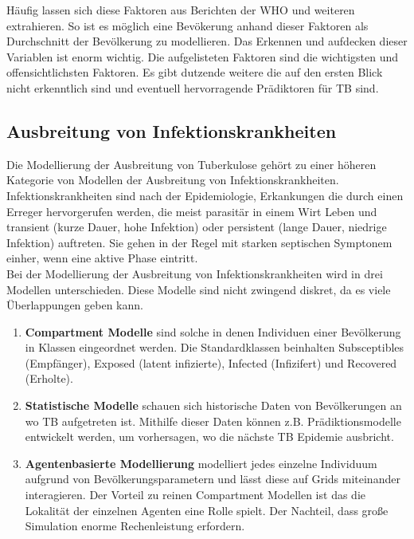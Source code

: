 \documentclass[paper=a4, fontsize=11pt, ngerman, abstract=on]{scrartcl}
\numberwithin{equation}{section} %
\numberwithin{figure}{section} %
\numberwithin{table}{section} %
\begin{document}
Häufig lassen sich diese Faktoren aus Berichten der WHO und weiteren extrahieren. So ist es möglich eine Bevökerung anhand dieser Faktoren als Durchschnitt der Bevölkerung zu modellieren. Das Erkennen und aufdecken dieser Variablen ist enorm wichtig. Die aufgelisteten Faktoren sind die wichtigsten und offensichtlichsten Faktoren. Es gibt dutzende weitere die auf den ersten Blick nicht erkenntlich sind und eventuell hervorragende Prädiktoren für TB sind. \cite{WHOTB2016}

\subsection{Ausbreitung von Infektionskrankheiten}

Die Modellierung der Ausbreitung von Tuberkulose gehört zu einer höheren Kategorie von Modellen der Ausbreitung von Infektionskrankheiten. Infektionskrankheiten sind nach der Epidemiologie, Erkankungen die durch einen Erreger hervorgerufen werden, die meist parasitär in einem Wirt Leben und transient (kurze Dauer, hohe Infektion) oder persistent (lange Dauer, niedrige Infektion) auftreten. Sie gehen in der Regel mit starken septischen Symptonem einher, wenn eine aktive Phase eintritt. \\

Bei der Modellierung der Ausbreitung von Infektionskrankheiten wird in drei Modellen unterschieden. Diese Modelle sind nicht zwingend diskret, da es viele Überlappungen geben kann.

\begin{enumerate}
\item{\textbf{Compartment Modelle} sind solche in denen Individuen einer Bevölkerung in Klassen eingeordnet werden. Die Standardklassen beinhalten Subsceptibles (Empfänger), Exposed (latent infizierte), Infected (Infizifert) und Recovered (Erholte).}
\item{\textbf{Statistische Modelle} schauen sich historische Daten von Bevölkerungen an wo TB aufgetreten ist. Mithilfe dieser Daten können z.B. Prädiktionsmodelle entwickelt werden, um vorhersagen, wo die nächste TB Epidemie ausbricht.}
\item{\textbf{Agentenbasierte Modellierung} modelliert jedes einzelne Individuum aufgrund von Bevölkerungsparametern und lässt diese auf Grids miteinander interagieren. Der Vorteil zu reinen Compartment Modellen ist das die Lokalität der einzelnen Agenten eine Rolle spielt. Der Nachteil, dass große Simulation enorme Rechenleistung erfordern.}
\end{enumerate}
\end{document}
